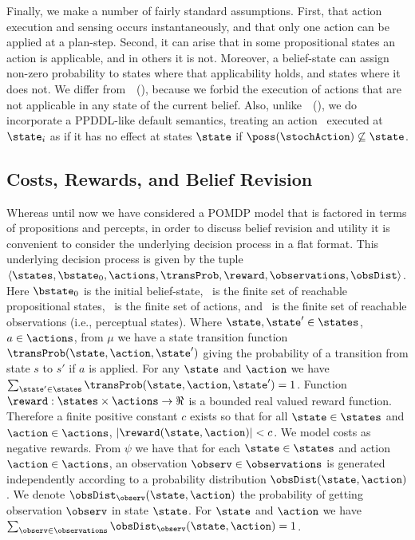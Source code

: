 Finally, we make a number of fairly standard assumptions. First, that
action execution and sensing occurs instantaneously, and that only one
action can be applied at a plan-step. Second, it can arise that in
some propositional states an action is applicable, and in others it is
not. Moreover, a belief-state can assign non-zero probability to
states where that applicability holds, and states where it does
not. We differ
from~\citeauthor{younes:littman:04}~(\citeyear{younes:littman:04}),
because we forbid the execution of actions that are not applicable in
any state of the current belief.  Also,
unlike~\citeauthor{hoffmann:brafman:2006}~(\citeyear{hoffmann:brafman:2006}),
we do incorporate a PPDDL-like default semantics, treating an action
\stochAction\ executed at $\state_i$ as if it has no effect at
states $\state$ if $\poss(\stochAction) \not\subseteq
\state$.


\subsection{Costs, Rewards, and Belief Revision}

Whereas until now we have considered a POMDP model that is factored in
terms of propositions and percepts, in order to discuss belief
revision and utility it is convenient to consider the underlying
decision process in a flat format. This underlying decision process is
given by the tuple
$\langle \states, \bstate_0, \actions, \transProb, \reward,
\observations, \obsDist \rangle$. Here $\bstate_0$ is the initial
belief-state, \states\ is the finite set of reachable propositional
states, \actions\ is the finite set of actions, and \observations\ is
the finite set of reachable observations (i.e., perceptual states).
Where $\state, \state' \in \states$, $a \in \actions$, from $\mu$ we
have a state transition function $\transProb(\state, \action,
\state')$ giving the probability of a transition from state $s$ to
$s'$ if $a$ is applied. For any $\state$ and $\action$ we have
$\sum_{\state' \in \states} \transProb(\state, \action, \state') = 1$.
Function $\reward:\states \times \actions \to \Re$ is a bounded real
valued reward function. Therefore a finite positive constant $c$
exists so that for all $\state \in \states$ and $\action \in
\actions$, $|\reward(\state, \action)| < c$. We model costs as
negative rewards.
From $\psi$ we have that for each $\state \in \states$ and action
$\action \in \actions$, an observation $\observ \in \observations$ is
generated independently according to a probability distribution
$\obsDist(\state, \action)$. We denote $\obsDist_\observ(\state,
\action)$ the probability of getting observation $\observ$ in state
$\state$. For $\state$ and $\action$ we have $\sum_{\observ \in
\observations} \obsDist_\observ(\state, \action) = 1$.

